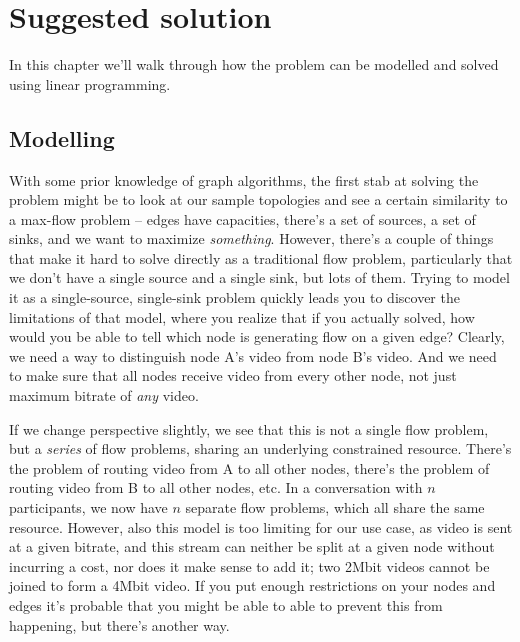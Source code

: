 \chapter{Suggested solution}
\label{chp:suggested-solution}

In this chapter we'll walk through how the problem can be modelled and solved using linear programming.


\section{Modelling}

With some prior knowledge of graph algorithms, the first stab at solving the problem might be to look at our sample topologies and see a certain similarity to a max-flow problem -- edges have capacities, there's a set of sources, a set of sinks, and we want to maximize \emph{something}. However, there's a couple of things that make it hard to solve directly as a traditional flow problem, particularly that we don't have a single source and a single sink, but lots of them. Trying to model it as a single-source, single-sink problem quickly leads you to discover the limitations of that model, where you realize that if you actually solved, how would you be able to tell which node is generating flow on a given edge? Clearly, we need a way to distinguish node A's video from node B's video. And we need to make sure that all nodes receive video from every other node, not just maximum bitrate of \emph{any} video.

If we change perspective slightly, we see that this is not a single flow problem, but a \emph{series} of flow problems, sharing an underlying constrained resource. There's the problem of routing video from A to all other nodes, there's the problem of routing video from B to all other nodes, etc. In a conversation with $n$ participants, we now have $n$ separate flow problems, which all share the same resource. However, also this model is too limiting for our use case, as video is sent at a given bitrate, and this stream can neither be split at a given node without incurring a cost, nor does it make sense to add it; two 2Mbit videos cannot be joined to form a 4Mbit video. If you put enough restrictions on your nodes and edges it's probable that you might be able to able to prevent this from happening, but there's another way.

